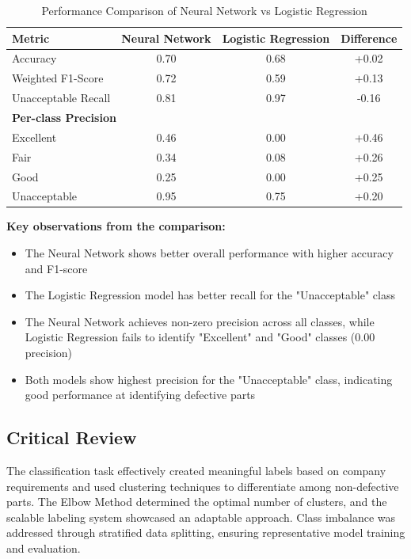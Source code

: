 \documentclass{article}
\begin{document}
\begin{table}[htbp]
    \centering
    \caption{Performance Comparison of Neural Network vs Logistic Regression}
    \begin{tabular}{lccc}
        \toprule
        \textbf{Metric} & \textbf{Neural Network} & \textbf{Logistic Regression} & \textbf{Difference} \\
        \midrule
        Accuracy & 0.70 & 0.68 & +0.02 \\
        Weighted F1-Score & 0.72 & 0.59 & +0.13 \\
        Unacceptable Recall & 0.81 & 0.97 & -0.16 \\
        \midrule
        \multicolumn{4}{l}{\textbf{Per-class Precision}} \\
        Excellent & 0.46 & 0.00 & +0.46 \\
        Fair & 0.34 & 0.08 & +0.26 \\
        Good & 0.25 & 0.00 & +0.25 \\
        Unacceptable & 0.95 & 0.75 & +0.20 \\
        \bottomrule
    \end{tabular}
    \label{tab:model_comparison}
\end{table}


\noindent\textbf{Key observations from the comparison:}
\begin{itemize}
    \item The Neural Network shows better overall performance with higher accuracy and F1-score
    
    \item The Logistic Regression model has better recall for the "Unacceptable" class
    
    \item The Neural Network achieves non-zero precision across all classes, while Logistic Regression fails to identify "Excellent" and "Good" classes ($0.00$ precision)
    
    \item Both models show highest precision for the "Unacceptable" class, indicating good performance at identifying defective parts
\end{itemize}

\subsection{Critical Review}

The classification task effectively created meaningful labels based on company requirements and used clustering techniques to differentiate among non-defective parts. The Elbow Method determined the optimal number of clusters, and the scalable labeling system showcased an adaptable approach. Class imbalance was addressed through stratified data splitting, ensuring representative model training and evaluation.
\end{document}
